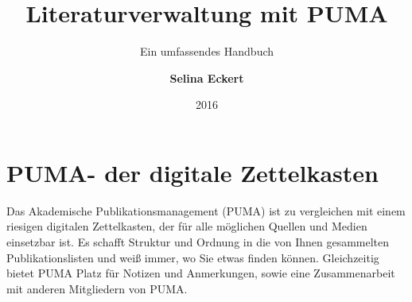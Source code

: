 \documentclass[a4paper,11pt,twoside]{scrbook}
\begin{document}
    \title{\Huge Literaturverwaltung mit PUMA}
    \subtitle{\Large Ein umfassendes Handbuch}
    \author{\textbf{Selina Eckert}}
    \date{2016}

\maketitle
{} 
\tableofcontents 
\newpage
{} 
\section{PUMA- der digitale Zettelkasten}
Das Akademische Publikationsmanagement (PUMA) ist zu vergleichen mit einem riesigen digitalen Zettelkasten, der für alle möglichen Quellen und Medien einsetzbar ist. Es schafft Struktur und Ordnung in die von Ihnen gesammelten Publikationslisten und weiß immer, wo Sie etwas finden können. Gleichzeitig bietet PUMA Platz für Notizen und Anmerkungen, sowie eine Zusammenarbeit mit anderen Mitgliedern von PUMA. 
\end{document}
